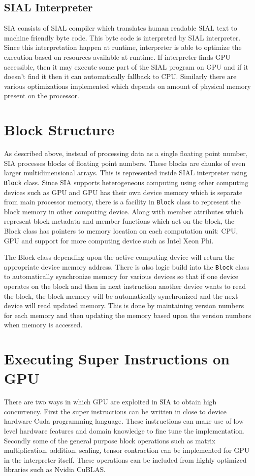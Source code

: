 \subsection{SIAL Interpreter}
SIA consists of SIAL compiler which translates human readable SIAL text to
machine friendly byte code. This byte code is interpreted by SIAL interpreter.
Since this interpretation happen at runtime, interpreter is able to optimize the
execution based on resources available at runtime. If interpreter finds GPU
accessible, then it may execute some part of the SIAL program on GPU and if it
doesn't find it then it can automatically fallback to CPU. Similarly there are
various optimizations implemented which depends on amount of physical memory
present on the processor.

\section{Block Structure}
As described above, instead of processing data as a single floating point
number, SIA processes blocks of floating point numbers. These blocks are chunks
of even larger multidimensional arrays. This is represented inside SIAL
interpreter using \texttt{Block} class. Since SIA supports heterogeneous computing
using other computing devices such as GPU and GPU has their own device memory
which is separate from main processor memory, there is a facility in
\texttt{Block} class to represent the block memory in other
computing device. Along with member attributes which represent block metadata
and member functions which act on the block, the Block class has pointers to
memory location on each computation unit: CPU, GPU and support for more
computing device such as Intel Xeon Phi.

The Block class depending upon the active computing device will return the
appropriate device memory address. There is also logic build into the \texttt{Block}
class to automatically synchronize memory for various devices so that if one
device operates on the block and then in next instruction another device wants
to read the block, the block memory will be automatically synchronized and the
next device will read updated memory. This is done by maintaining version numbers
for each memory and then updating the memory based upon the version numbers when
memory is accessed.

\section{Executing Super Instructions on GPU}
There are two ways in which GPU are exploited in SIA to obtain high concurrency.
First the super instructions can be written in close to device hardware Cuda
programming language. These instructions can make use of low level hardware
features and domain knowledge to fine tune the implementation. Secondly some of
the general purpose block operations such as matrix multiplication, addition,
scaling, tensor contraction can be implemented for GPU in the interpreter
itself. These operations can be included from highly optimized libraries such as
Nvidia CuBLAS.

